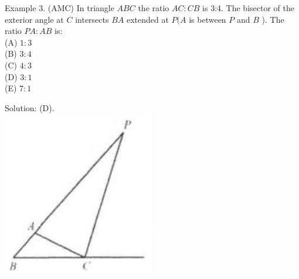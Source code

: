 \documentclass[10pt]{article}
\begin{document}
Example 3. (AMC) In triangle \(A B C\) the ratio \(A C: C B\) is 3:4. The bisector of the exterior angle at \(C\) intersects \(B A\) extended at \(P(A\) is between \(P\) and \(B\) ). The ratio \(P A: A B\) is:\\
(A) \(1: 3\)\\
(B) \(3: 4\)\\
(C) \(4: 3\)\\
(D) \(3: 1\)\\
(E) \(7: 1\)

Solution: (D).\\
\includegraphics[max width=\textwidth, center]{2025_04_17_97bc1f7e44d93c271a88g-055(2)}
\end{document}
